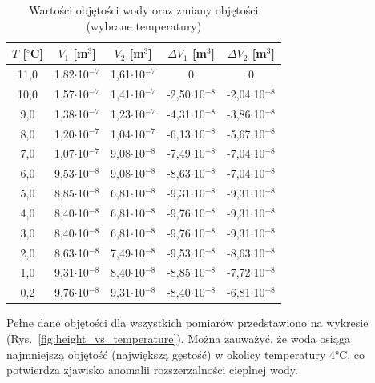 \documentclass[a4paper,12pt]{article}
\begin{document}
\begin{table}[H]
    \centering
    \caption{Wartości objętości wody oraz zmiany objętości (wybrane temperatury)}
    \label{tab:objetosci}
    \begin{tabular}{|c|c|c|c|c|}
        \hline
        $T$ [$^\circ$C] & $V_1$ [m$^3$] & $V_2$ [m$^3$] & $\Delta V_1$ [m$^3$] & $\Delta V_2$ [m$^3$] \\
        \hline
        11,0 & 1,82$\cdot$10$^{-7}$ & 1,61$\cdot$10$^{-7}$ & 0 & 0 \\
        10,0 & 1,57$\cdot$10$^{-7}$ & 1,41$\cdot$10$^{-7}$ & -2,50$\cdot$10$^{-8}$ & -2,04$\cdot$10$^{-8}$ \\
        9,0 & 1,38$\cdot$10$^{-7}$ & 1,23$\cdot$10$^{-7}$ & -4,31$\cdot$10$^{-8}$ & -3,86$\cdot$10$^{-8}$ \\
        8,0 & 1,20$\cdot$10$^{-7}$ & 1,04$\cdot$10$^{-7}$ & -6,13$\cdot$10$^{-8}$ & -5,67$\cdot$10$^{-8}$ \\
        7,0 & 1,07$\cdot$10$^{-7}$ & 9,08$\cdot$10$^{-8}$ & -7,49$\cdot$10$^{-8}$ & -7,04$\cdot$10$^{-8}$ \\
        6,0 & 9,53$\cdot$10$^{-8}$ & 9,08$\cdot$10$^{-8}$ & -8,63$\cdot$10$^{-8}$ & -7,04$\cdot$10$^{-8}$ \\
        5,0 & 8,85$\cdot$10$^{-8}$ & 6,81$\cdot$10$^{-8}$ & -9,31$\cdot$10$^{-8}$ & -9,31$\cdot$10$^{-8}$ \\
        4,0 & 8,40$\cdot$10$^{-8}$ & 6,81$\cdot$10$^{-8}$ & -9,76$\cdot$10$^{-8}$ & -9,31$\cdot$10$^{-8}$ \\
        3,0 & 8,40$\cdot$10$^{-8}$ & 6,81$\cdot$10$^{-8}$ & -9,76$\cdot$10$^{-8}$ & -9,31$\cdot$10$^{-8}$ \\
        2,0 & 8,63$\cdot$10$^{-8}$ & 7,49$\cdot$10$^{-8}$ & -9,53$\cdot$10$^{-8}$ & -8,63$\cdot$10$^{-8}$ \\
        1,0 & 9,31$\cdot$10$^{-8}$ & 8,40$\cdot$10$^{-8}$ & -8,85$\cdot$10$^{-8}$ & -7,72$\cdot$10$^{-8}$ \\
        0,2 & 9,76$\cdot$10$^{-8}$ & 9,31$\cdot$10$^{-8}$ & -8,40$\cdot$10$^{-8}$ & -6,81$\cdot$10$^{-8}$ \\
        \hline
    \end{tabular}
\end{table}

Pełne dane objętości dla wszystkich pomiarów przedstawiono na wykresie (Rys.~\ref{fig:height_vs_temperature}). Można zauważyć, że woda osiąga najmniejszą objętość (największą gęstość) w okolicy temperatury 4°C, co potwierdza zjawisko anomalii rozszerzalności cieplnej wody.
\end{document}
